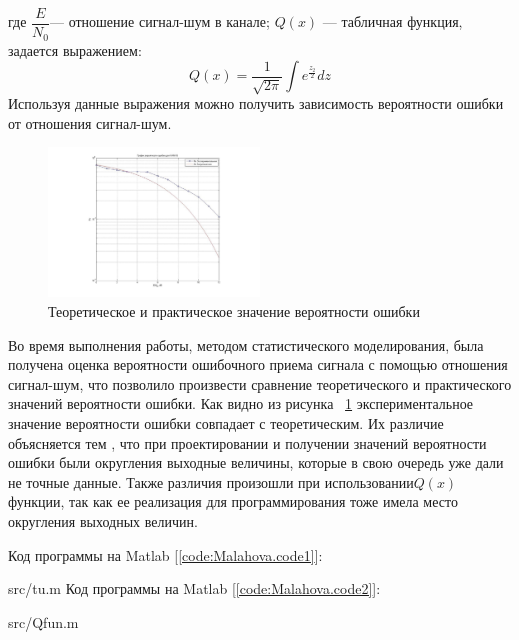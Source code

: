 где $\dfrac{E}{N_{0}}$--- отношение сигнал-шум в канале; $Q(x)$ --- табличная функция, задается выражением:
\begin{equation}
Q(x)=\dfrac{1}{\sqrt{2\pi}}\int e^{\frac{z_{2}}{2}}dz
\end{equation}
Используя данные выражения можно получить зависимость вероятности ошибки от отношения сигнал-шум.

 \begin{figure}[H]
	\centering
	\includegraphics[width=0.5\textwidth]{img/mal9}
	\caption{Теоретическое и практическое значение вероятности ошибки}
	\label{fig:mal9}
\end{figure}
Во время выполнения работы, методом статистического моделирования, была получена оценка вероятности ошибочного приема сигнала с помощью отношения сигнал-шум, что позволило произвести сравнение теоретического и практического значений вероятности ошибки.
Как видно из рисунка ~\ref{fig:mal9} экспериментальное значение вероятности ошибки совпадает с теоретическим.
Их различие объясняется тем , что при проектировании и получении значений вероятности ошибки были округления выходные величины, которые в свою очередь уже дали не точные данные. Также различия произошли при использовании$ Q(x)$ функции, так как ее реализация для программирования тоже имела место округления выходных величин.

Код программы на Matlab [\ref{code:Malahova.code1}]:

{src/tu.m}
%
Код программы на Matlab [\ref{code:Malahova.code2}]:

{src/Qfun.m}
%

